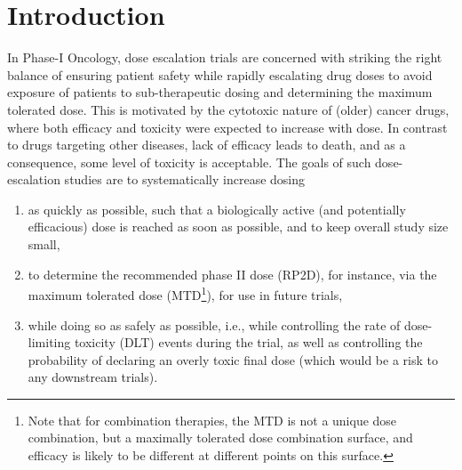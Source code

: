 \documentclass[AMA,STIX1COL]{WileyNJD-v2}
\newcommand{\revision}[1]{#1}
\begin{document}


\maketitle

\newpage
\section{Introduction}\label{sec1}
In Phase-I Oncology, dose escalation trials are concerned with striking the right balance of ensuring patient safety while rapidly escalating drug doses to avoid exposure of patients to sub-therapeutic dosing and determining the maximum tolerated dose\cite{LeTourneau2009}. This is motivated by the cytotoxic nature of (older) cancer drugs, where both efficacy and toxicity were expected to increase with dose. In contrast to drugs targeting other diseases, lack of efficacy leads to death, and as a consequence, some level of toxicity is acceptable. 
The goals of such dose-escalation studies are to systematically increase dosing
\begin{enumerate}
\item as quickly as possible, such that a biologically active (and potentially efficacious) dose is reached as soon as possible, and to keep overall study size small,
\item to determine the recommended phase II dose (RP2D), for instance, via the maximum tolerated dose (MTD\footnote{\revision{Note that for combination therapies, the MTD is not a unique dose combination, but a maximally tolerated dose combination surface, and efficacy is likely to be different at different points on this surface.}}), for use in future trials\cite{Neuenschwander2014},
\item while doing so as safely as possible, i.e., while controlling the rate of dose-limiting toxicity (DLT) events during the trial, as well as controlling the probability of declaring an overly toxic final dose (which would be a risk to any downstream trials).
\end{enumerate}
\end{document}
